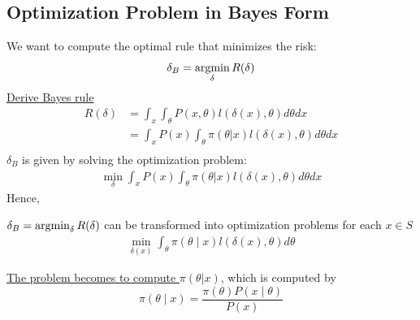 \documentclass[11pt]{elegantbook}
\newcommand{\argmin}{\operatornamewithlimits{argmin}}
\begin{document}
\subsection{Optimization Problem in Bayes Form}
We want to compute the optimal rule that minimizes the risk:
$$\delta_B=\argmin_\delta R(\delta)$$
\underline{Derive Bayes rule}
\begin{equation}
    \begin{aligned}
        R(\delta)&=\int_x\int_\theta P(x,\theta) l(\delta(x),\theta) d\theta dx\\
        &=\int_x P(x)\int_\theta \pi(\theta|x) l(\delta(x),\theta) d\theta dx\\
    \end{aligned}
    \nonumber
\end{equation}
$\delta_B$ is given by solving the optimization problem:
\begin{equation}
    \begin{aligned}
        \min_\delta \int_x P(x)\int_\theta \pi(\theta|x) l(\delta(x),\theta) d\theta dx
    \end{aligned}
    \nonumber
\end{equation}
Hence,
\begin{proposition}
    $\delta_B=\argmin_\delta R(\delta)$ can be transformed into optimization problems for each $x\in S$
    \begin{equation}
        \begin{aligned}
            \min_{\delta(x)} \int_\theta \pi(\theta\mid x) l(\delta(x),\theta) d\theta
        \end{aligned}
        \nonumber
    \end{equation}
\end{proposition}
\underline{The problem becomes to compute $\pi(\theta|x)$}, which is computed by $$\pi(\theta\mid x)=\frac{\pi(\theta)P(x\mid \theta)}{P(x)}$$
\end{document}

